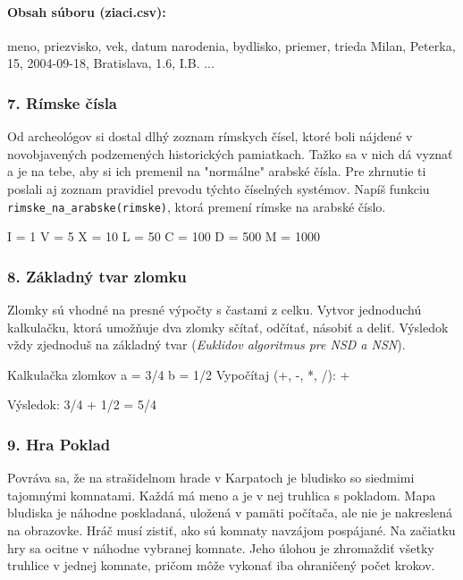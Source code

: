 \paragraph{Obsah súboru (ziaci.csv):}

\begin{code}
meno, priezvisko, vek, datum narodenia, bydlisko, priemer, trieda
Milan, Peterka, 15, 2004-09-18, Bratislava, 1.6, I.B.
...
\end{code}


\subsubsection*{7. Rímske čísla}
Od archeológov si dostal dlhý zoznam rímskych čísel, ktoré boli nájdené v novobjavených podzemených historických pamiatkach. Tažko sa v nich dá vyznať a je na tebe, aby si ich premenil na "normálne" arabské čísla. Pre zhrnutie ti poslali aj zoznam pravidiel prevodu týchto číselných systémov. Napíš funkciu \verb|rimske_na_arabske(rimske)|, ktorá premení rímske na arabské číslo.

\begin{code}
I = 1
V = 5
X = 10
L = 50
C = 100
D = 500
M = 1000
\end{code}


\subsubsection*{8. Základný tvar zlomku}
Zlomky sú vhodné na presné výpočty s častami z celku. Vytvor jednoduchú kalkulačku, ktorá umožňuje dva zlomky sčítať, odčítať, násobiť a deliť. Výsledok vždy zjednoduš na základný tvar (\emph{Euklidov algoritmus pre NSD a NSN}).

\begin{code}
Kalkulačka zlomkov
a = 3/4
b = 1/2
Vypočítaj (+, -, *, /): +

Výsledok:
3/4 + 1/2 = 5/4
\end{code}


\subsubsection*{9. Hra Poklad}
Povráva sa, že na strašidelnom hrade v Karpatoch je bludisko so siedmimi tajomnými komnatami. Každá má meno a je v nej truhlica s pokladom. Mapa bludiska je náhodne poskladaná, uložená v pamäti počítača, ale nie je nakreslená na obrazovke. Hráč musí zistiť, ako sú komnaty navzájom pospájané. Na začiatku hry sa ocitne v náhodne vybranej komnate. Jeho úlohou je zhromaždiť všetky truhlice v jednej komnate, pričom môže vykonať iba ohraničený počet krokov.

